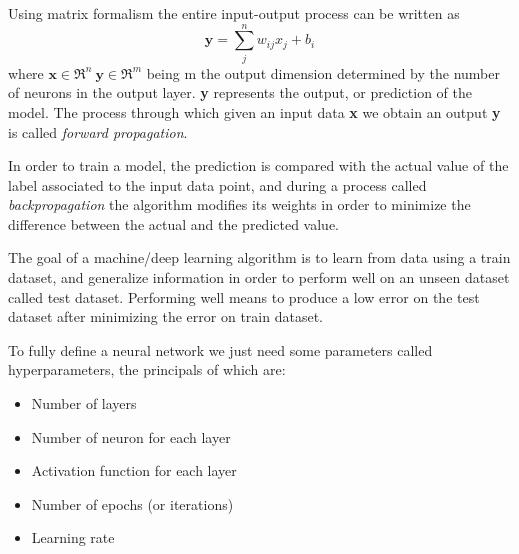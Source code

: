 \documentclass[11pt]{report}
\begin{document}

Using matrix formalism the entire input-output process can be written as
\begin{equation}
\mathbf{y} = \sum_j^n w_{ij} x_j + b_i
\end{equation}
 where $\textbf{x} \in \Re^n \ \textbf{y} \in \Re^m $ being m the output dimension determined by the number of neurons in the output layer. \textbf{y} represents the output, or prediction of the model.
The process through which given an input data \textbf{x} we obtain an output \textbf{y} is called \emph{forward propagation}.

In order to train a model, the prediction is compared with the actual value of the label associated to the input data point, and during a process called \emph{backpropagation} the algorithm modifies its weights in order to minimize the difference between the actual and the predicted value.

The goal of a machine/deep learning algorithm is to learn from data using a train dataset, and generalize information in order to perform well on an unseen dataset called test dataset.
Performing well means to produce a low error on the test dataset after minimizing the error on train dataset.
\hfill

\noindent To fully define a neural network we just need some parameters called hyperparameters, the principals of which are:

\begin{itemize}
\item Number of layers
\item Number of neuron for each layer
\item Activation function for each layer
\item Number of epochs (or iterations)
\item Learning rate
\end{itemize}
\end{document}
